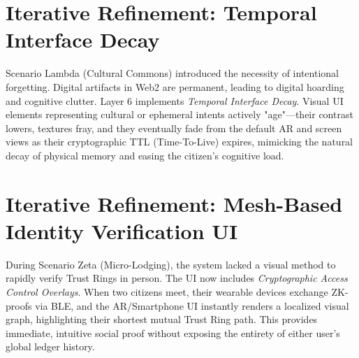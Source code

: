 \section{Iterative Refinement: Temporal Interface Decay}
Scenario Lambda (Cultural Commons) introduced the necessity of intentional forgetting. Digital artifacts in Web2 are permanent, leading to digital hoarding and cognitive clutter. Layer 6 implements \textit{Temporal Interface Decay}. Visual UI elements representing cultural or ephemeral intents actively "age"—their contrast lowers, textures fray, and they eventually fade from the default AR and screen views as their cryptographic TTL (Time-To-Live) expires, mimicking the natural decay of physical memory and easing the citizen's cognitive load.

\section{Iterative Refinement: Mesh-Based Identity Verification UI}
During Scenario Zeta (Micro-Lodging), the system lacked a visual method to rapidly verify Trust Rings in person. The UI now includes \textit{Cryptographic Access Control Overlays}. When two citizens meet, their wearable devices exchange ZK-proofs via BLE, and the AR/Smartphone UI instantly renders a localized visual graph, highlighting their shortest mutual Trust Ring path. This provides immediate, intuitive social proof without exposing the entirety of either user's global ledger history.
